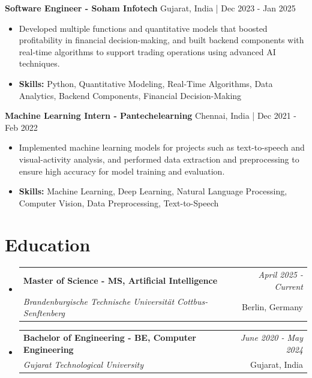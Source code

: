\documentclass[a4paper,11pt]{article}
\makeatletter
\newcommand{\resumeSubheading}[4]{
\vspace{0.5mm}\item
    \begin{tabular*}{\linewidth}[t]{l@{\extracolsep{\fill}}r}
        \textbf{#1} & \textit{\footnotesize{#4}} \\
        \textit{\footnotesize{#3}} &  \footnotesize{#2}\\
    \end{tabular*}
    \vspace{-2.4mm}
}
\makeatother
\begin{document}
\vspace{1mm}
  \textbf{Software Engineer - Soham Infotech} \hfill Gujarat, India | Dec 2023 - Jan 2025
\vspace{-1.5mm} %
\begin{itemize}
  \item Developed multiple functions and quantitative models that boosted profitability in financial decision-making, and built backend components with real-time algorithms to support trading operations using advanced AI techniques.

\vspace{-2mm}
  \item \textbf{Skills:} Python, Quantitative Modeling, Real-Time Algorithms, Data Analytics, Backend Components, Financial Decision-Making
\end{itemize}

\vspace{1mm}
  \textbf{Machine Learning Intern - Pantechelearning} \hfill Chennai, India | Dec 2021 - Feb 2022
\vspace{-1.5mm} %
\begin{itemize}
  \item Implemented machine learning models for projects such as text-to-speech and visual-activity analysis, and performed data extraction and preprocessing to ensure high accuracy for model training and evaluation.
\vspace{-2mm}
  \item \textbf{Skills:} Machine Learning, Deep Learning, Natural Language Processing, Computer Vision, Data Preprocessing, Text-to-Speech
\end{itemize}\section{\textbf{Education}}
\vspace{-0.4mm}

\begin{itemize}[leftmargin=0.15in, label={}]
\resumeSubheading
{Master of Science - MS, Artificial Intelligence }{Berlin, Germany}
{Brandenburgische Technische Universität Cottbus-Senftenberg  }{April 2025 - Current}

\vspace{1.0mm} %
\resumeSubheading
{Bachelor of Engineering - BE, Computer Engineering  }{Gujarat, India}
{Gujarat Technological University }{June 2020 - May 2024}

\end{itemize}
\end{document}

